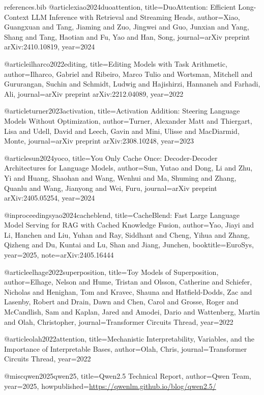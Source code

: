 \begin{filecontents*}[overwrite]{references.bib}
@article{xiao2024duoattention,
  title={{DuoAttention: Efficient Long-Context LLM Inference with Retrieval and Streaming Heads}},
  author={Xiao, Guangxuan and Tang, Jiaming and Zuo, Jingwei and Guo, Junxian and Yang, Shang and Tang, Haotian and Fu, Yao and Han, Song},
  journal={arXiv preprint arXiv:2410.10819},
  year={2024}
}

@article{ilharco2022editing,
  title={{Editing Models with Task Arithmetic}},
  author={Ilharco, Gabriel and Ribeiro, Marco Tulio and Wortsman, Mitchell and Gururangan, Suchin and Schmidt, Ludwig and Hajishirzi, Hannaneh and Farhadi, Ali},
  journal={arXiv preprint arXiv:2212.04089},
  year={2022}
}

@article{turner2023activation,
  title={{Activation Addition: Steering Language Models Without Optimization}},
  author={Turner, Alexander Matt and Thiergart, Lisa and Udell, David and Leech, Gavin and Mini, Ulisse and MacDiarmid, Monte},
  journal={arXiv preprint arXiv:2308.10248},
  year={2023}
}

@article{sun2024yoco,
  title={{You Only Cache Once: Decoder-Decoder Architectures for Language Models}},
  author={Sun, Yutao and Dong, Li and Zhu, Yi and Huang, Shaohan and Wang, Wenhui and Ma, Shuming and Zhang, Quanlu and Wang, Jianyong and Wei, Furu},
  journal={arXiv preprint arXiv:2405.05254},
  year={2024}
}

@inproceedings{yao2024cacheblend,
  title={{CacheBlend: Fast Large Language Model Serving for RAG with Cached Knowledge Fusion}},
  author={Yao, Jiayi and Li, Hanchen and Liu, Yuhan and Ray, Siddhant and Cheng, Yihua and Zhang, Qizheng and Du, Kuntai and Lu, Shan and Jiang, Junchen},
  booktitle={EuroSys},
  year={2025},
  note={arXiv:2405.16444}
}

@article{elhage2022superposition,
  title={{Toy Models of Superposition}},
  author={Elhage, Nelson and Hume, Tristan and Olsson, Catherine and Schiefer, Nicholas and Henighan, Tom and Kravec, Shauna and Hatfield-Dodds, Zac and Lasenby, Robert and Drain, Dawn and Chen, Carol and Grosse, Roger and McCandlish, Sam and Kaplan, Jared and Amodei, Dario and Wattenberg, Martin and Olah, Christopher},
  journal={Transformer Circuits Thread},
  year={2022}
}

@article{olah2022attention,
  title={{Mechanistic Interpretability, Variables, and the Importance of Interpretable Bases}},
  author={Olah, Chris},
  journal={Transformer Circuits Thread},
  year={2022}
}

@misc{qwen2025qwen25,
  title={{Qwen2.5 Technical Report}},
  author={{Qwen Team}},
  year={2025},
  howpublished={\url{https://qwenlm.github.io/blog/qwen2.5/}}
}
\end{filecontents*}


